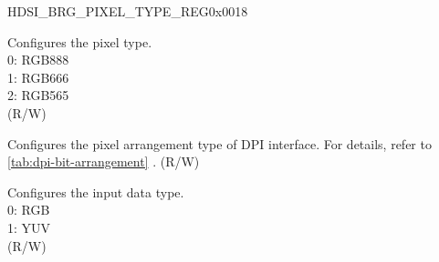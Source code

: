 \begin{register}{H}{DSI\_BRG\_PIXEL\_TYPE\_REG}{0x0018}\label{regdesc:DSIBRGPIXELTYPEREG}
%
%
%
%
\regnewline%
\begin{regdesc}\begin{reglist}
\label{fielddesc:DSIBRGRAWTYPE}\item [DSI\_BRG\_RAW\_TYPE] Configures the pixel type. \\0: RGB888\\1: RGB666\\2: RGB565 \\(R/W)
\label{fielddesc:DSIBRGDPICONFIG}\item [DSI\_BRG\_DPI\_CONFIG] Configures the pixel arrangement type of DPI interface. For details, refer to \ref{tab:dpi-bit-arrangement} . (R/W)
\label{fielddesc:DSIBRGDATAINTYPE}\item [DSI\_BRG\_DATA\_IN\_TYPE] Configures the input data type. \\0: RGB\\1: YUV \\(R/W)
\end{reglist}\end{regdesc}
\end{register}


